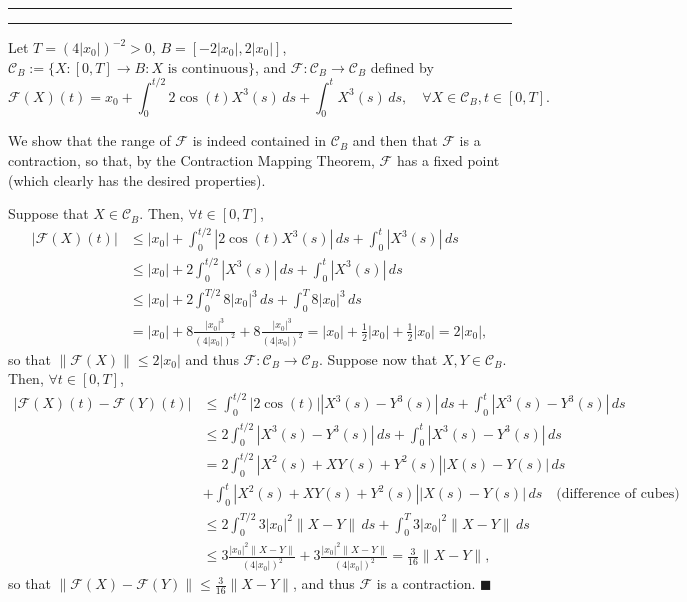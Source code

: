 \documentclass[11pt]{article}
\newcounter{questionCounter}
\newcounter{partCounter}[questionCounter]
\newenvironment{question}[2][\arabic{questionCounter}]{%
    \setcounter{partCounter}{0}%
    \vspace{.25in} \hrule \vspace{0.5em}%
        \noindent{\bf #2}%
    \vspace{0.8em} \hrule \vspace{.10in}%
    \addtocounter{questionCounter}{1}%
}{}
\renewcommand{\qed}{\quad $\blacksquare$}
\newcommand{\F}{\mathcal{F}}
\newcommand{\C}{\mathcal{C}}
\begin{document}
\begin{question}{Problem 2}
Let $T = (4|x_0|)^{-2} > 0$, $B = [-2|x_0|, 2|x_0|]$,
$\C_B := \{X : [0,T] \rightarrow B : X \mbox{ is continuous}\}$, and
$\F : \C_B \rightarrow \C_B$ defined by
\[\F(X)(t) = x_0 + \int_0^{t/2}2\cos(t)X^3(s) \, ds + \int_0^t X^3(s) \, ds,
 \quad \forall X \in \C_B, t \in [0,T].\]

We show that the range of $\F$ is indeed contained in $\C_B$ and then that $\F$
is a contraction, so that, by the Contraction Mapping Theorem, $\F$ has a fixed
point (which clearly has the desired properties).

Suppose that $X \in \C_B$. Then, $\forall t \in [0,T]$,
\begin{align*}
|\F(X)(t)|
 & \leq |x_0| + \int_0^{t/2}|2\cos(t)X^3(s)| \, ds + \int_0^t |X^3(s)| \, ds \\
 & \leq |x_0| + 2\int_0^{t/2} |X^3(s)| \, ds + \int_0^t |X^3(s)| \, ds \\
 & \leq |x_0| + 2\int_0^{T/2} 8|x_0|^3 \, ds + \int_0^T 8|x_0|^3 \, ds \\
 & =    |x_0| + 8\frac{|x_0|^3}{(4|x_0|)^2} + 8\frac{|x_0|^3}{(4|x_0|)^2}
   =    |x_0| + \frac12 |x_0| + \frac12|x_0|
   =    2|x_0|,
\end{align*}
so that $\|\F(X)\| \leq 2|x_0|$ and thus $\F : \C_B \rightarrow \C_B$. Suppose
now that $X,Y \in \C_B$. Then,
$\forall t \in [0,T]$,
\begin{align*}
|\F(X)(t) - \F(Y)(t)|
 & \leq \int_0^{t/2}|2\cos(t)||X^3(s) - Y^3(s)| \, ds
   +    \int_0^t|X^3(s) - Y^3(s)| \, ds \\
 & \leq 2\int_0^{t/2}|X^3(s) - Y^3(s)| \, ds
   +    \int_0^t|X^3(s) - Y^3(s)| \, ds \\
 & =    2\int_0^{t/2}|X^2(s) + XY(s) + Y^2(s)||X(s) - Y(s)| \, ds \\
 & +    \int_0^t|X^2(s) + XY(s) + Y^2(s)||X(s) - Y(s)| \, ds
  \quad \mbox{(difference of cubes)} \\
 & \leq 2\int_0^{T/2}3|x_0|^2\|X - Y\| \, ds 
   +    \int_0^T3|x_0|^2\|X - Y\| \, ds \\
 & \leq 3\frac{|x_0|^2\|X - Y\|}{(4|x_0|)^2}
   +    3\frac{|x_0|^2\|X - Y\|}{(4|x_0|)^2}
   =    \frac{3}{16}\|X - Y\|,
\end{align*}
so that $\|\F(X) - \F(Y)\| \leq \frac{3}{16} \|X - Y\|$, and thus $\F$ is a
contraction. \qed
\end{question}
\end{document}
